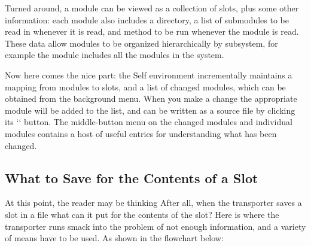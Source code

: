 \documentclass[letterpaper,10pt,english]{sphinxmanual}
\begin{document}
Turned around, a module can be viewed as a collection of slots, plus some other information: each
module also includes a directory, a list of submodules to be read in whenever it is read, and
 method to be run whenever the module is read. These data allow modules to be organized
hierarchically by subsystem, for example the  module includes all the modules in the 
system.

Now here comes the nice part: the Self environment incrementally maintains a mapping from modules
to slots, and a list of changed modules, which can be obtained from the background menu.
When you make a change the appropriate module will be added to the list, and can be written as a
source file by clicking its `‘ button. The middle-button menu on the changed modules and individual
modules contains a host of useful entries for understanding what has been changed.


\subsection{What to Save for the Contents of a Slot}
\label{\detokenize{howtoprg:what-to-save-for-the-contents-of-a-slot}}
At this point, the reader may be thinking  After all, when the transporter saves a slot in a file what can
it put for the contents of the slot? Here is where the transporter runs smack into the problem of not
enough information, and a variety of means have to be used. As shown in the flowchart below:
\end{document}
